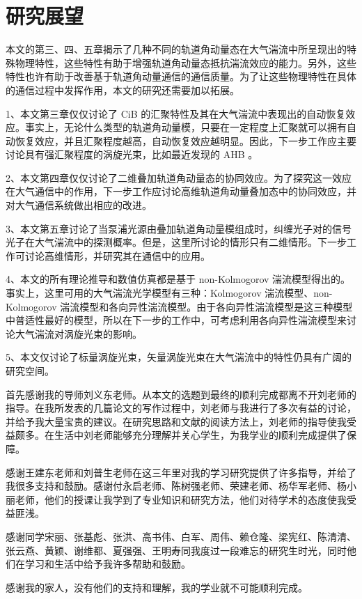 \documentclass[master]{thesis-uestc}
\begin{document}
\section{研究展望}
本文的第三、四、五章揭示了几种不同的轨道角动量态在大气湍流中所呈现出的特殊物理特性，这些特性有助于增强轨道角动量态抵抗湍流效应的能力。另外，这些特性也许有助于改善基于轨道角动量通信的通信质量。为了让这些物理特性在具体的通信过程中发挥作用，本文的研究还需要加以拓展。

1、本文第三章仅仅讨论了 CiB 的汇聚特性及其在大气湍流中表现出的自动恢复效应。事实上，无论什么类型的轨道角动量模，只要在一定程度上汇聚就可以拥有自动恢复效应，并且汇聚程度越高，自动恢复效应越明显。因此，下一步工作应主要讨论具有强汇聚程度的涡旋光束，比如最近发现的 AHB 。

2、本文第四章仅仅讨论了二维叠加轨道角动量态的协同效应。为了探究这一效应在大气通信中的作用，下一步工作应讨论高维轨道角动量叠加态中的协同效应，并对大气通信系统做出相应的改进。

3、本文第五章讨论了当泵浦光源由叠加轨道角动量模组成时，纠缠光子对的信号光子在大气湍流中的探测概率。但是，这里所讨论的情形只有二维情形。下一步工作可讨论高维情形，并研究其在通信中的应用。

4、本文的所有理论推导和数值仿真都是基于 non-Kolmogorov 湍流模型得出的。事实上，这里可用的大气湍流光学模型有三种：Kolmogorov 湍流模型、non-Kolmogorov 湍流模型和各向异性湍流模型。由于各向异性湍流模型是这三种模型中普适性最好的模型，所以在下一步的工作中，可考虑利用各向异性湍流模型来讨论大气湍流对涡旋光束的影响。

5、本文仅讨论了标量涡旋光束，矢量涡旋光束在大气湍流中的特性仍具有广阔的研究空间。


\thesisacknowledgement
首先感谢我的导师刘义东老师。从本文的选题到最终的顺利完成都离不开刘老师的指导。在我所发表的几篇论文的写作过程中，刘老师与我进行了多次有益的讨论，并给予我大量宝贵的建议。在研究思路和文献的阅读方法上，刘老师的指导使我受益颇多。在生活中刘老师能够充分理解并关心学生，为我学业的顺利完成提供了保障。

感谢王建东老师和刘普生老师在这三年里对我的学习研究提供了许多指导，并给了我很多支持和鼓励。感谢付永启老师、陈树强老师、荣建老师、杨华军老师、杨小丽老师，他们的授课让我学到了专业知识和研究方法，他们对待学术的态度使我受益匪浅。

感谢同学宋丽、张基彪、张洪、高书伟、白军、周伟、赖仓隆、梁宪红、陈清清、张云燕、黄颖、谢维都、夏强强、王明寿同我度过一段难忘的研究生时光，同时他们在学习和生活中给予我许多帮助和鼓励。

感谢我的家人，没有他们的支持和理解，我的学业就不可能顺利完成。




\thesisappendix

\end{document}
